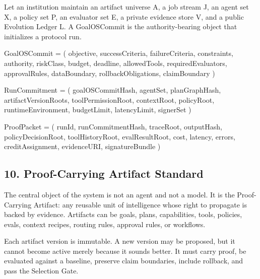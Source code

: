 \documentclass[
]{article}
\newenvironment{Shaded}{}{}
\newcommand{\NormalTok}[1]{#1}
\begin{document}
Let an institution maintain an artifact universe A, a job stream J, an
agent set X, a policy set P, an evaluator set E, a private evidence
store V, and a public Evolution Ledger L. A GoalOSCommit is the
authority-bearing object that initializes a protocol run.

\begin{Shaded}
\begin{Highlighting}[]
\NormalTok{GoalOSCommit = (}
\NormalTok{  objective, successCriteria, failureCriteria, constraints,}
\NormalTok{  authority, riskClass, budget, deadline,}
\NormalTok{  allowedTools, requiredEvaluators, approvalRules,}
\NormalTok{  dataBoundary, rollbackObligations, claimBoundary}
\NormalTok{)}

\NormalTok{RunCommitment = (}
\NormalTok{  goalOSCommitHash, agentSet, planGraphHash,}
\NormalTok{  artifactVersionRoots, toolPermissionRoot,}
\NormalTok{  contextRoot, policyRoot, runtimeEnvironment,}
\NormalTok{  budgetLimit, latencyLimit, signerSet}
\NormalTok{)}

\NormalTok{ProofPacket = (}
\NormalTok{  runId, runCommitmentHash, traceRoot, outputHash,}
\NormalTok{  policyDecisionRoot, toolHistoryRoot,}
\NormalTok{  evalResultRoot, cost, latency, errors,}
\NormalTok{  creditAssignment, evidenceURI, signatureBundle}
\NormalTok{)}
\end{Highlighting}
\end{Shaded}

\subsection{10. Proof-Carrying Artifact
Standard}\label{proof-carrying-artifact-standard}

The central object of the system is not an agent and not a model. It is
the Proof-Carrying Artifact: any reusable unit of intelligence whose
right to propagate is backed by evidence. Artifacts can be goals, plans,
capabilities, tools, policies, evals, context recipes, routing rules,
approval rules, or workflows.

Each artifact version is immutable. A new version may be proposed, but
it cannot become active merely because it sounds better. It must carry
proof, be evaluated against a baseline, preserve claim boundaries,
include rollback, and pass the Selection Gate.
\end{document}
